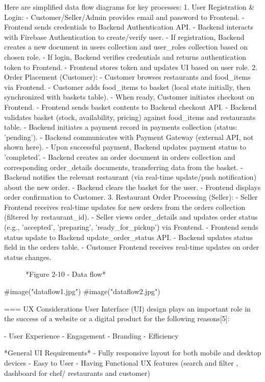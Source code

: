 Here are simplified data flow diagrams for key processes:
1. User Registration & Login:
- Customer/Seller/Admin provides email and password to Frontend.
- Frontend sends credentials to Backend Authentication API.
- Backend interacts with Firebase Authentication to create/verify user.
- If registration, Backend creates a new document in users collection and user_roles collection based on chosen role.
- If login, Backend verifies credentials and returns authentication token to Frontend.
- Frontend stores token and updates UI based on user role.
2. Order Placement (Customer):
- Customer browses restaurants and food_items via Frontend.
- Customer adds food_items to basket (local state initially, then synchronized with baskets table).
- When ready, Customer initiates checkout on Frontend.
- Frontend sends basket contents to Backend checkout API.
- Backend validates basket (stock, availability, pricing) against food_items and restaurants table.
- Backend initiates a payment record in payments collection (status: 'pending').
- Backend communicates with Payment Gateway (external API, not shown here).
- Upon successful payment, Backend updates payment status to 'completed'.
- Backend creates an order document in orders collection and corresponding order_details documents, transferring data from the basket.
- Backend notifies the relevant restaurant (via real-time update/push notification) about the new order.
- Backend clears the basket for the user.
- Frontend displays order confirmation to Customer.
3. Restaurant Order Processing (Seller):
- Seller Frontend receives real-time updates for new orders from the orders collection (filtered by restaurant_id).
- Seller views order_details and updates order status (e.g., 'accepted', 'preparing', 'ready_for_pickup') via Frontend.
- Frontend sends status update to Backend update_order_status API.
- Backend updates status field in the orders table.
- Customer Frontend receives real-time updates on order status changes.

\
\
\
\
\
\
*Figure 2-10 - Data flow*

#image("dataflow1.jpg")
#image("dataflow2.jpg")

=== UX Considerations
User Interface (UI) design plays an important role in the success of a website or a digital product for the following reasons[5]:

    - User Experience
    - Engagement
    - Branding
    - Efficiency
    
*General UI Requirements*
- Fully responsive layout for both mobile and desktop devices
- Easy to User
- Having Functional UX features (search and filter , dashboard for chef/ restaurants and customer)
\

